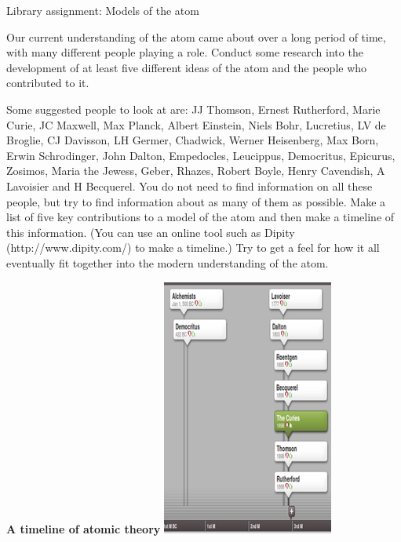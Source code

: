             \begin{project}{Library assignment: Models of the atom}
            \nopagebreak
            \label{m38756*eip-3}

Our current understanding of the atom came about over a long period of time, with many different people playing a role. Conduct some research into the development of at least five different ideas of the atom and the people who contributed to it.\\ \newline
\begin{minipage}{.6\textwidth}
Some suggested people to look at are: JJ Thomson, Ernest Rutherford, Marie Curie, JC Maxwell, Max Planck, Albert Einstein, Niels Bohr, Lucretius, LV de Broglie, CJ Davisson, LH Germer, Chadwick, Werner Heisenberg, Max Born, Erwin Schrodinger, John Dalton, Empedocles, Leucippus, Democritus, Epicurus, Zosimos, Maria the Jewess, Geber, Rhazes, Robert Boyle, Henry Cavendish, A Lavoisier and H Becquerel. You do not need to find information on all these people, but try to find information about as many of them as possible.
\label{m38756*id7342}Make a list of five key contributions to a model of the atom and then make a timeline of this information. (You can use an online tool such as Dipity (http://www.dipity.com/) to make a timeline.) Try to get a feel for how it all eventually fit together into the modern understanding of the atom. 
\end{minipage}
\begin{minipage}{.4\textwidth}
 \begin{center}
\textbf{A timeline of atomic theory}
  \includegraphics[height=1.2\textwidth]{photos/timeline_atom.png}
 \end{center}


\end{minipage}
\end{project}
